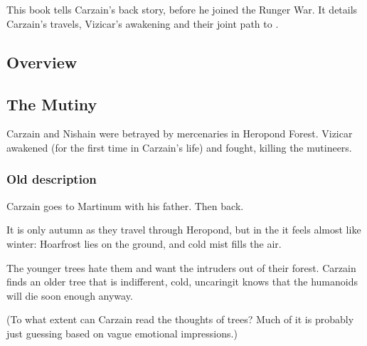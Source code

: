 \chapter{\CarzainPrequelBook}
This book tells Carzain's back story, before he joined the Runger War. 
It details Carzain's travels, Vizicar's awakening and their joint path to \kenosis. 















\section{Overview}















\section{The Mutiny}
Carzain and Nishain were betrayed by mercenaries in Heropond Forest. 
Vizicar awakened (for the first time in Carzain's life) and fought, killing the mutineers. 









\subsection{Old description}
Carzain goes to Martinum with his father. Then back.

It is only autumn as they travel through Heropond, but in the \Wylde it feels almost like winter: Hoarfrost lies on the ground, and cold mist fills the air.

The younger trees hate them and want the intruders out of their forest. Carzain finds an older tree that is indifferent, cold, uncaring\dash it knows that the humanoids will die soon enough anyway. 

(To what extent can Carzain read the thoughts of trees? Much of it is probably just guessing based on vague emotional impressions.)

